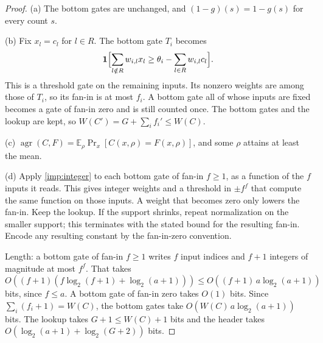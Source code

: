 \documentclass[11pt,letterpaper]{article}
\theoremstyle{definition}
\theoremstyle{remark}
\newcommand{\E}{\mathbb E}
\newcommand{\agr}{\operatorname{agr}}
\newcommand{\ind}{\mathbf 1}
\newcommand{\lgx}{\log_2}
\begin{document}
\begin{proof}
(a) The bottom gates are unchanged, and \((1-g)(s)=1-g(s)\) for every
count \(s\).

(b) Fix \(x_l=c_l\) for \(l\in R\). The bottom gate \(T_i\) becomes
\[
 \ind\Bigl[\sum_{l\notin R}w_{i,l}x_l\ge\theta_i-\sum_{l\in R}w_{i,l}c_l\Bigr].
\]
This is a threshold gate on the remaining inputs. Its nonzero weights
are among those of \(T_i\), so its fan-in is at most \(f_i\). A
bottom gate all of whose inputs are fixed becomes a gate of fan-in zero
and is still counted once. The bottom gates and the lookup are kept, so
\(W(C')=G+\sum_if_i'\le W(C)\).

(c) \(\agr(C,F)=\E_\rho\Pr_x[C(x,\rho)=F(x,\rho)]\), and some
\(\rho\) attains at least the mean.

(d) Apply \cref{imp:integer} to each bottom gate of fan-in \(f\ge1\),
as a function of the \(f\) inputs it reads. This gives integer weights
and a threshold in \(\pm f^f\) that compute the same function on those
inputs. A weight that becomes zero only lowers the fan-in. Keep the
lookup. If the support shrinks, repeat normalization on the smaller
support; this terminates with the stated bound for the resulting
fan-in. Encode any resulting constant by the fan-in-zero convention.

Length: a bottom gate of fan-in \(f\ge1\) writes \(f\) input indices
and \(f+1\) integers of magnitude at most \(f^f\). That takes
\(O((f+1)(f\lgx(f+1)+\lgx(a+1)))\le O((f+1)\,a\lgx(a+1))\) bits,
since \(f\le a\). A bottom gate of fan-in zero takes \(O(1)\) bits.
Since \(\sum_i(f_i+1)=W(C)\), the bottom gates take
\(O(W(C)\,a\lgx(a+1))\) bits. The lookup takes \(G+1\le W(C)+1\) bits
and the header takes \(O(\lgx(a+1)+\lgx(G+2))\) bits.


\end{proof}
\end{document}
